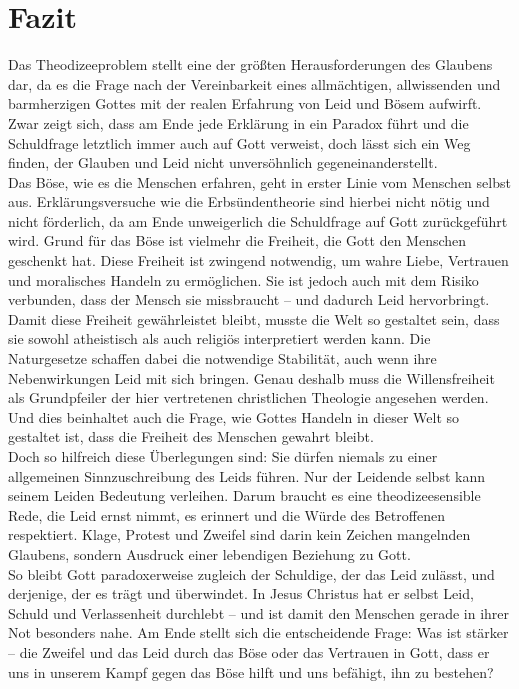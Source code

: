 \section{Fazit}
Das Theodizeeproblem stellt eine der größten Herausforderungen des Glaubens dar, da es die Frage nach der Vereinbarkeit eines allmächtigen, allwissenden und barmherzigen Gottes mit der realen Erfahrung von Leid und Bösem aufwirft. Zwar zeigt sich, dass am Ende jede Erklärung in ein Paradox führt und die Schuldfrage letztlich immer auch auf Gott verweist, doch lässt sich ein Weg finden, der Glauben und Leid nicht unversöhnlich gegeneinanderstellt.\\

Das Böse, wie es die Menschen erfahren, geht in erster Linie vom Menschen selbst aus. Erklärungsversuche wie die Erbsündentheorie sind hierbei nicht nötig und nicht förderlich, da am Ende unweigerlich die Schuldfrage auf Gott zurückgeführt wird. Grund für das Böse ist vielmehr die Freiheit, die Gott den Menschen geschenkt hat. Diese Freiheit ist zwingend notwendig, um wahre Liebe, Vertrauen und moralisches Handeln zu ermöglichen. Sie ist jedoch auch mit dem Risiko verbunden, dass der Mensch sie missbraucht – und dadurch Leid hervorbringt.\\

Damit diese Freiheit gewährleistet bleibt, musste die Welt so gestaltet sein, dass sie sowohl atheistisch als auch religiös interpretiert werden kann. Die Naturgesetze schaffen dabei die notwendige Stabilität, auch wenn ihre Nebenwirkungen Leid mit sich bringen. Genau deshalb muss die Willensfreiheit als Grundpfeiler der hier vertretenen christlichen Theologie angesehen werden. Und dies beinhaltet auch die Frage, wie Gottes Handeln in dieser Welt so gestaltet ist, dass die Freiheit des Menschen gewahrt bleibt.\\

Doch so hilfreich diese Überlegungen sind: Sie dürfen niemals zu einer allgemeinen Sinnzuschreibung des Leids führen. Nur der Leidende selbst kann seinem Leiden Bedeutung verleihen. Darum braucht es eine theodizeesensible Rede, die Leid ernst nimmt, es erinnert und die Würde des Betroffenen respektiert. Klage, Protest und Zweifel sind darin kein Zeichen mangelnden Glaubens, sondern Ausdruck einer lebendigen Beziehung zu Gott.\\

So bleibt Gott paradoxerweise zugleich der Schuldige, der das Leid zulässt, und derjenige, der es trägt und überwindet. In Jesus Christus hat er selbst Leid, Schuld und Verlassenheit durchlebt – und ist damit den Menschen gerade in ihrer Not besonders nahe. Am Ende stellt sich die entscheidende Frage: Was ist stärker – die Zweifel und das Leid durch das Böse oder das Vertrauen in Gott, dass er uns in unserem Kampf gegen das Böse hilft und uns befähigt, ihn zu bestehen?\\

